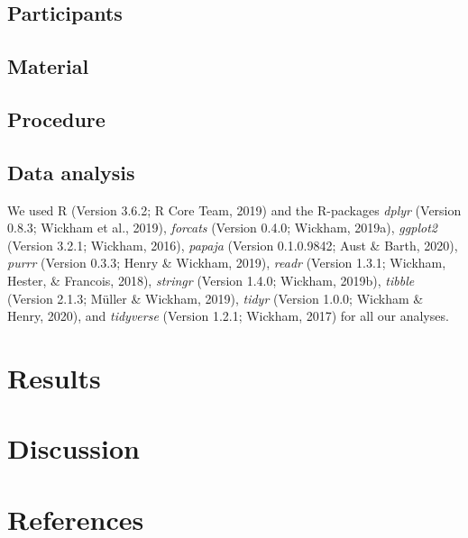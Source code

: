 \documentclass[man]{apa6}
\begin{document}
\hypertarget{participants}{%
\subsection{Participants}\label{participants}}

\hypertarget{material}{%
\subsection{Material}\label{material}}

\hypertarget{procedure}{%
\subsection{Procedure}\label{procedure}}

\hypertarget{data-analysis}{%
\subsection{Data analysis}\label{data-analysis}}

We used R (Version 3.6.2; R Core Team, 2019) and the R-packages \emph{dplyr} (Version 0.8.3; Wickham et al., 2019), \emph{forcats} (Version 0.4.0; Wickham, 2019a), \emph{ggplot2} (Version 3.2.1; Wickham, 2016), \emph{papaja} (Version 0.1.0.9842; Aust \& Barth, 2020), \emph{purrr} (Version 0.3.3; Henry \& Wickham, 2019), \emph{readr} (Version 1.3.1; Wickham, Hester, \& Francois, 2018), \emph{stringr} (Version 1.4.0; Wickham, 2019b), \emph{tibble} (Version 2.1.3; Müller \& Wickham, 2019), \emph{tidyr} (Version 1.0.0; Wickham \& Henry, 2020), and \emph{tidyverse} (Version 1.2.1; Wickham, 2017) for all our analyses.

\hypertarget{results}{%
\section{Results}\label{results}}

\hypertarget{discussion}{%
\section{Discussion}\label{discussion}}

\newpage

\hypertarget{references}{%
\section{References}\label{references}}

\begingroup
\setlength{\parindent}{-0.5in}
\setlength{\leftskip}{0.5in}
\end{document}
